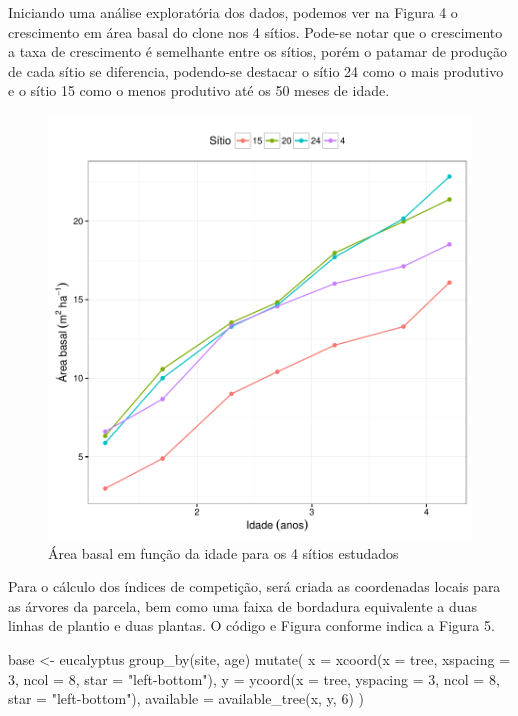 \documentclass[article]{jss}
\begin{document}
Iniciando uma análise exploratória dos dados, podemos ver na Figura 4 o
crescimento em área basal do clone nos 4 sítios. Pode-se notar que o
crescimento a taxa de crescimento é semelhante entre os sítios, porém o
patamar de produção de cada sítio se diferencia, podendo-se destacar o
sítio 24 como o mais produtivo e o sítio 15 como o menos produtivo até
os 50 meses de idade.

\begin{CodeChunk}
\begin{figure}

{\centering \includegraphics{comp3-paper_files/figure-latex/cresc_g-1} 

}

\caption[Área basal em função da idade para os 4 sítios estudados]{Área basal em função da idade para os 4 sítios estudados}\label{fig:cresc_g}
\end{figure}
\end{CodeChunk}

Para o cálculo dos índices de competição, será criada as coordenadas
locais para as árvores da parcela, bem como uma faixa de bordadura
equivalente a duas linhas de plantio e duas plantas. O código e Figura
conforme indica a Figura 5.

\begin{CodeChunk}
\begin{CodeInput}
base <- eucalyptus %
  group_by(site, age) %
  mutate(
    x = xcoord(x = tree, xspacing =  3, ncol =  8, star = "left-bottom"),
    y = ycoord(x = tree, yspacing =  3, ncol =  8, star = "left-bottom"),
    available = available_tree(x, y, 6)
  ) 
\end{CodeInput}
\end{CodeChunk}
\end{document}
